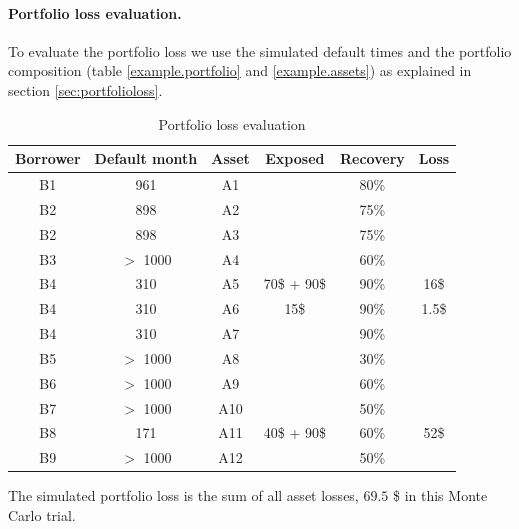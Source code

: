 \documentclass[a4paper,12pt,final]{article}
\begin{document}
\paragraph{Portfolio loss evaluation.} To evaluate the portfolio loss 
we use the simulated default times and the portfolio composition (table 
\ref{example.portfolio} and \ref{example.assets}) as explained in section 
\ref{sec:portfolioloss}.
{\small
\begin{table}[!hbt]
\begin{center}
\begin{tabular}[]{|c|c|c|c|c|c|}
Borrower & Default month & Asset & Exposed & Recovery & Loss \\
\hline
B1       & 961           &  A1   &             &  80\%    &       \\
B2       & 898           &  A2   &             &  75\%    &       \\
B2       & 898           &  A3   &             &  75\%    &       \\
B3       & $>$ 1000      &  A4   &             &  60\%    &       \\
B4       & 310           &  A5   & 70\$ + 90\$ &  90\%    &  16\$ \\
B4       & 310           &  A6   & 15\$        &  90\%    & 1.5\$ \\
B4       & 310           &  A7   &             &  90\%    &       \\
B5       & $>$ 1000      &  A8   &             &  30\%    &       \\
B6       & $>$ 1000      &  A9   &             &  60\%    &       \\
B7       & $>$ 1000      &  A10  &             &  50\%    &       \\
B8       & 171           &  A11  & 40\$ + 90\$ &  60\%    &  52\$ \\
B9       & $>$ 1000      &  A12  &             &  50\%    &       \\
\end{tabular}
\caption{Portfolio loss evaluation}
\end{center}
\end{table}
}

The simulated portfolio loss is the sum of all asset losses, $69.5$ \$ in this 
Monte Carlo trial. 

\FloatBarrier
\end{document}
